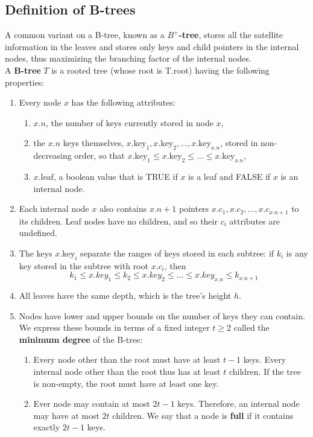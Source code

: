 \documentclass[12pt]{article}
\begin{document}
\subsection{Definition of B-trees}

A common variant on a B-tree, known as a \textbf{$B^+$-tree}, stores all the satellite information in the leaves and stores only keys and child pointers in the internal nodes, thus maximizing the branching factor of the internal nodes. \\

A \textbf{B-tree} $T$ is a rooted tree (whose root is T.root) having the following properties:
\begin{enumerate}
  \item Every node $x$ has the following attributes:
    \begin{enumerate}
    	\item $x.n$, the number of keys currently stored in node $x$,
        \item the $x.n$ keys themselves, $x.\text{key}_1, x.\text{key}_2, \dots, x.\text{key}_{x.n}$, stored in non-decreasing order, so that $x.\text{key}_1 \le x.\text{key}_2 \le \dots \le x.\text{key}_{x.n}$,
        \item $x.\text{leaf}$, a boolean value that is TRUE if $x$ is a leaf and FALSE if $x$ is an internal node.
    \end{enumerate}
  \item Each internal node $x$ also contains $x.n+1$ pointers $x.c_1, x.c_2, \dots, x.c_{x.n+1}$ to its children. Leaf nodes have no children, and so their $c_i$ attributes are undefined.
  \item The keys $x.\text{key}_i$ separate the ranges of keys stored in each subtree: if $k_i$ is any key stored in the subtree with root $x.c_i$, then 
    \begin{equation}
      k_1 \le x.key_1 \le k_2 \le x.key_2 \le \dots \le x.key_{x.n} \le k_{x.n+1}
    \end{equation}
  \item All leaves have the same depth, which is the tree's height $h$.
  \item Nodes have lower and upper bounds on the number of keys they can contain. We express these bounds in terms of a fixed integer $t \ge 2$ called the \textbf{minimum degree} of the B-tree:
    \begin{enumerate}
      \item Every node other than the root must have at least $t-1$ keys. Every internal node other than the root thus has at least $t$ children. If the tree is non-empty, the root must have at least one key.
      \item Ever node may contain at most $2t-1$ keys. Therefore, an internal node may have at most $2t$ children. We say that a node is \textbf{full} if it contains exactly $2t-1$ keys.
    \end{enumerate}
\end{enumerate}
\end{document}
